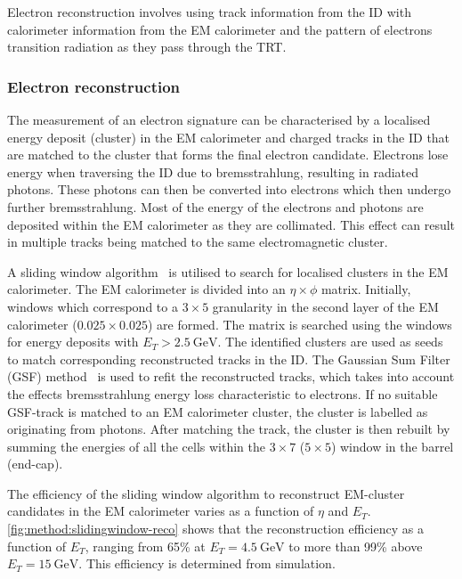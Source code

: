 Electron reconstruction involves using track information from the ID with calorimeter information from the EM calorimeter and the pattern of electrons transition radiation as they pass through the TRT.

\subsubsection{Electron reconstruction}
The measurement of an electron signature can be characterised by a localised energy deposit (cluster) in the EM calorimeter and charged tracks in the ID that are matched to the cluster that forms the final electron candidate. Electrons lose energy when traversing the ID due to bremsstrahlung, resulting in radiated photons. These photons can then be converted into electrons which then undergo further bremsstrahlung. Most of the energy of the electrons and photons are deposited within the EM calorimeter as they are collimated. This effect can result in multiple tracks being matched to the same electromagnetic cluster. 

A sliding window algorithm~\cite{slidingwindow} is utilised to search for localised clusters in the EM calorimeter. The EM calorimeter is divided into an $\eta \times \phi$ matrix. Initially, windows which correspond to a $3 \times 5$ granularity in the second layer of the EM calorimeter ($0.025 \times 0.025$) are formed. The matrix is searched using the windows for energy deposits with $E_T > \SI{2.5}{\giga\electronvolt}$. The identified clusters are used as seeds to match corresponding reconstructed tracks in the ID. The Gaussian Sum Filter (GSF) method~\cite{ATLAS:CONF-2012-047} is used to refit the reconstructed tracks, which takes into account the effects bremsstrahlung energy loss characteristic to electrons. If no suitable GSF-track is matched to an EM calorimeter cluster, the cluster is labelled as originating from photons.  After matching the track, the cluster is then rebuilt by summing the energies of all the cells within the $3 \times 7$ ($5 \times 5$) window in the barrel (end-cap).

The efficiency of the sliding window algorithm to reconstruct EM-cluster candidates in the EM calorimeter varies as a function of $\eta$ and $E_T$. \cref{fig:method:slidingwindow-reco} shows that the reconstruction efficiency as a function of $E_T$, ranging from 65\% at $E_T = \SI{4.5}{\giga\electronvolt}$ to more than 99\% above $E_T = \SI{15}{\giga\electronvolt}$. This efficiency is determined from simulation.

